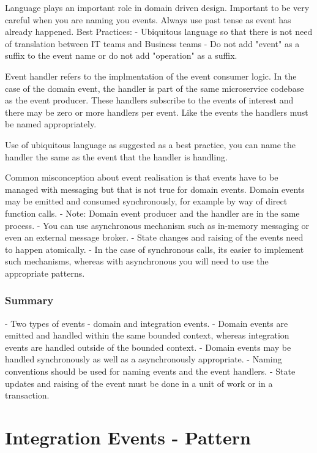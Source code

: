 \documentclass[a4paper, 11pt]{book}
\begin{document}
{    Language plays an important role in domain driven design. Important to be very careful when you are naming you events.
    Always use past tense as event has already happened.
    Best Practices:
    - Ubiquitous language so that there is not need of translation between IT teams and Business teams
    - Do not add "event" as a suffix to the event name or do not add "operation" as a suffix.

    Event handler refers to the implmentation of the event consumer logic.
    In the case of the domain event, the handler is part of the same microservice codebase as the event producer.
    These handlers subscribe to the events  of interest and there may be zero or more handlers per event.
    Like the events the handlers must be named appropriately.

    Use of ubiquitous language as suggested as a best practice, you can name the handler the same as the event that the handler is handling.

    Common misconception about event realisation is that events have to be managed with messaging but that is not true for domain events.
    Domain events may be emitted and consumed synchronously, for example by way of direct function calls.
    - Note: Domain event producer and the handler are in the same process.
    - You can use asynchronous mechanism such as in-memory messaging or even an external message broker.
    - State changes and raising of the events need to happen atomically.
    - In the case of synchronous calls, its easier to implement such mechanisms, whereas with asynchronous you will need to use the appropriate patterns.

    \subsubsection{Summary}
    - Two types of events - domain and integration events.
    - Domain events are emitted and handled within the same bounded context, whereas integration events are handled outside of the bounded context.
    - Domain events may be handled synchronously as well as a asynchronously appropriate.
    - Naming conventions should be used for naming events and the event handlers.
    - State updates and raising of the event must be done in a unit of work or in a transaction.

    \section{Integration Events - Pattern}


}
\end{document}
